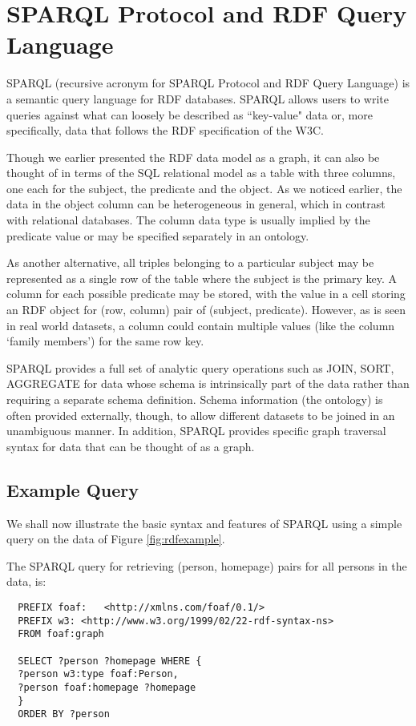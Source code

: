 \section[SPARQL]{SPARQL Protocol and RDF Query Language}

SPARQL (recursive acronym for SPARQL Protocol and RDF Query Language) is a semantic query language for RDF databases. SPARQL allows users to write queries against what can loosely be described as ``key-value" data or, more specifically, data that follows the RDF specification of the W3C. 

Though we earlier presented the RDF data model as a graph, it can also be thought of in terms of the SQL relational model as a table with three columns, one each for the subject, the predicate and the object. As we noticed earlier, the data in the object column can be heterogeneous in general, which in contrast with relational databases. The column data type is usually implied by the predicate value or may be specified separately in an ontology. 

As another alternative, all triples belonging to a particular subject may be represented as a single row of the table where the subject is the primary key. A column for each possible predicate may be stored, with the value in a cell storing an RDF object for (row, column) pair of (subject, predicate). However, as is seen in real world datasets, a column could contain multiple values (like the column `family members') for the same row key.

SPARQL provides a full set of analytic query operations such as JOIN, SORT, AGGREGATE for data whose schema is intrinsically part of the data rather than requiring a separate schema definition. Schema information (the ontology) is often provided externally, though, to allow different datasets to be joined in an unambiguous manner. In addition, SPARQL provides specific graph traversal syntax for data that can be thought of as a graph.

\subsection{Example Query}

We shall now illustrate the basic syntax and features of SPARQL using a simple query on the data of Figure \ref{fig:rdfexample}. 

The SPARQL query for retrieving (person, homepage) pairs for all persons in the data, is:
\begin{verbatim}
  PREFIX foaf:   <http://xmlns.com/foaf/0.1/>
  PREFIX w3: <http://www.w3.org/1999/02/22-rdf-syntax-ns>
  FROM foaf:graph
  
  SELECT ?person ?homepage WHERE {
  ?person w3:type foaf:Person,
  ?person foaf:homepage ?homepage
  }
  ORDER BY ?person
\end{verbatim}

